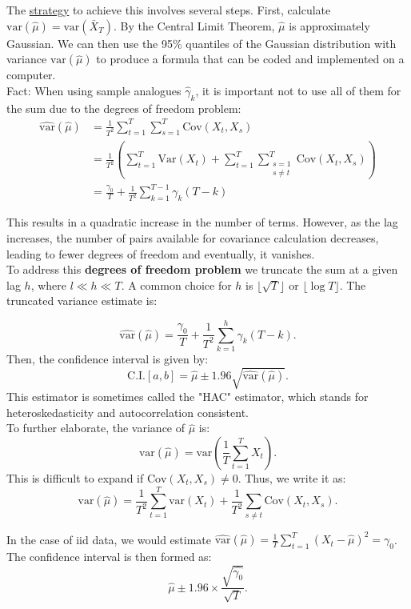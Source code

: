 The \underline{strategy} to achieve this involves several steps. First, calculate $\text{var}(\hat{\mu}) = \text{var}(\bar{X}_T)$. By the Central Limit Theorem, $\hat{\mu}$ is approximately Gaussian. We can then use the 95\% quantiles of the Gaussian distribution with variance $\text{var}(\hat{\mu})$ to produce a formula that can be coded and implemented on a computer.\\

Fact: When using sample analogues $\hat{\gamma}_k$, it is important not to use all of them for the sum due to the degrees of freedom problem:
\begin{align*}
    \widehat{\text{var}}(\hat{\mu}) &= \frac{1}{T^2} \sum_{t=1}^T \sum_{s=1}^T \text{Cov}(X_t, X_s) \\
    &= \frac{1}{T^2} \left( \sum_{t=1}^T \text{Var}(X_t) + \sum_{t=1}^T \sum_{\substack{s=1 \\ s \neq t}}^T \text{Cov}(X_t, X_s) \right) \\
    &= \frac{\gamma_0}{T} + \frac{1}{T^2} \sum_{k=1}^{T-1} \gamma_k(T - k)
\end{align*}

This results in a quadratic increase in the number of terms. However, as the lag increases, the number of pairs available for covariance calculation decreases, leading to fewer degrees of freedom and eventually, it vanishes.\\

To address this \textbf{degrees of freedom problem} we truncate the sum at a given lag $h$, where $l \ll h \ll T$. A common choice for $h$ is $\lfloor \sqrt{T} \rfloor$ or $\lfloor \log T \rfloor$. The truncated variance estimate is:

\[
\widehat{\text{var}}(\hat{\mu}) = \frac{\gamma_0}{T} + \frac{1}{T^2} \sum_{k=1}^h \gamma_k (T - k).
\]
Then, the confidence interval is given by:
\[
\text{C.I.} [a, b] = \hat{\mu} \pm 1.96 \sqrt{\widehat{\text{var}}(\hat{\mu})}.
\]
This estimator is sometimes called the "HAC" estimator, which stands for heteroskedasticity and autocorrelation consistent. \\

To further elaborate, the variance of $\hat{\mu}$ is:
\[
\text{var}(\hat{\mu}) = \text{var}\left(\frac{1}{T} \sum_{t=1}^T X_t\right).
\]
This is difficult to expand if $\text{Cov}(X_t, X_s) \neq 0$. Thus, we write it as:
\[
\text{var}(\hat{\mu}) = \frac{1}{T^2} \sum_{t=1}^T \text{var}(X_t) + \frac{1}{T^2} \sum_{s \neq t} \text{Cov}(X_t, X_s).
\]

In the case of iid data, we would estimate $\widehat{\text{var}}(\hat{\mu}) = \frac{1}{T} \sum_{t=1}^T (X_t - \hat{\mu})^2 = \gamma_0$. The confidence interval is then formed as:
\[
\hat{\mu} \pm 1.96 \times \frac{\sqrt{\hat{\gamma_0}}}{\sqrt{T}}.
\]


